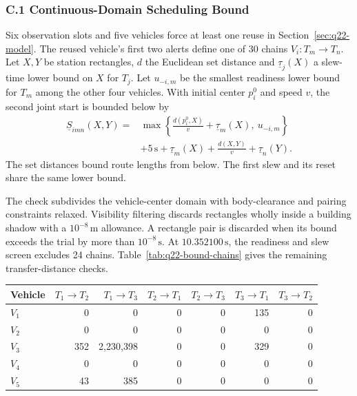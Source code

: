 \documentclass{swmcmthesis}
\begin{document}
\subsubsection*{C.1 Continuous-Domain Scheduling Bound}
\label{app:q22-bound}

Six observation slots and five vehicles force at least one reuse in Section~\ref{sec:q22-model}. The reused vehicle's first two alerts define one of 30 chains \(V_i:T_m\to T_n\). Let \(X,Y\) be station rectangles, \(d\) the Euclidean set distance and \(\underline{\tau}_j(X)\) a slew-time lower bound on \(X\) for \(T_j\). Let \(u_{-i,m}\) be the smallest readiness lower bound for \(T_m\) among the other four vehicles. With initial center \(p_i^0\) and speed \(v\), the second joint start is bounded below by
\begin{equation}
\label{eq:q22-continuous-bound}
\begin{aligned}
\underline{S}_{imn}(X,Y)={}&\max\!\left\{\frac{d(p_i^0,X)}{v}+\underline{\tau}_m(X),\ u_{-i,m}\right\}\\
&+5\,\mathrm s+\underline{\tau}_m(X)+\frac{d(X,Y)}{v}+\underline{\tau}_n(Y).
\end{aligned}
\end{equation}
The set distances bound route lengths from below. The first slew and its reset share the same lower bound.

The check subdivides the vehicle-center domain with body-clearance and pairing constraints relaxed. Visibility filtering discards rectangles wholly inside a building shadow with a \(10^{-8}\,\mathrm m\) allowance. A rectangle pair is discarded when its bound exceeds the trial by more than \(10^{-8}\,\mathrm s\). At \(10.352100\,\mathrm s\), the readiness and slew screen excludes 24 chains. Table~\ref{tab:q22-bound-chains} gives the remaining transfer-distance checks.

\begin{center}
    \begin{minipage}{\linewidth}
    \centering
    \captionsetup{type=table}
    \caption{Rectangle-pair evaluations after the initial screen, by vehicle and alert order.}
    \label{tab:q22-bound-chains}
    \setlength{\tabcolsep}{4pt}
    \begin{tabular}{@{}lrrrrrr@{}}
        \toprule
        Vehicle & \(T_1\to T_2\) & \(T_1\to T_3\) & \(T_2\to T_1\) & \(T_2\to T_3\) & \(T_3\to T_1\) & \(T_3\to T_2\) \\
        \midrule
        \(V_1\) & 0 & 0 & 0 & 0 & 135 & 0 \\
        \(V_2\) & 0 & 0 & 0 & 0 & 0 & 0 \\
        \(V_3\) & 352 & 2,230,398 & 0 & 0 & 329 & 0 \\
        \(V_4\) & 0 & 0 & 0 & 0 & 0 & 0 \\
        \(V_5\) & 43 & 385 & 0 & 0 & 0 & 0 \\
        \bottomrule
    \end{tabular}
    \end{minipage}
\end{center}
\end{document}
